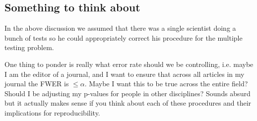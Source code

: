 \documentclass[twoside,12pt]{article}
\begin{document}
\subsection{Something to think about} 
In the above discussion we assumed that there was a single scientist doing a bunch of tests so he could appropriately correct his procedure for the multiple testing problem. 

One thing to ponder is really what error rate should we be controlling, i.e. maybe I am the editor of a journal, and I want to ensure that across all  articles in my journal the FWER is $\leq \alpha$. Maybe I want this to be true across the entire field? Should I be adjusting my p-values for people in other disciplines? Sounds absurd but it actually makes sense if you think about each of these procedures and their implications for reproducibility.
\end{document}
